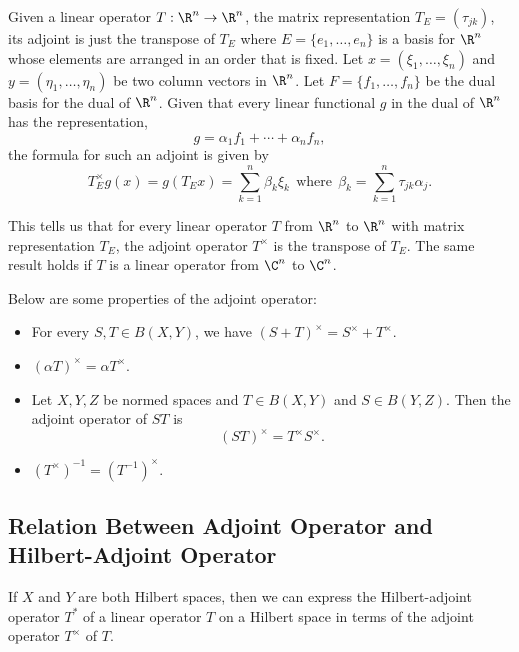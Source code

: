 \begin{eg}
  Given a linear operator \( T: \R^{n} \to \R^{n} \), the matrix representation \( {T}_{E} = ({\tau}_{jk})  \), its adjoint is just the transpose of \( {T}_{E} \) where \( E = \{  {e}_{1}, \dots, {e}_{n} \}   \) is a basis for \( \R^{n} \) whose elements are arranged in an order that is fixed. Let \( x = ({\xi}_{1}, \dots, {\xi}_{n}) \) and \( y = ({\eta}_{1} ,\dots, {\eta}_{n}) \) be two column vectors in \( \R^{n} \). Let \( F = \{  {f}_{1}, \dots, {f}_{n} \}   \) be the dual basis for the dual of \( \R^{n} \). Given that every linear functional \( g   \) in the dual of \( \R^{n} \) has the representation, 
  \[  g = {\alpha}_{1} {f}_{1} + \cdots + {\alpha}_{n} {f}_{n},  \]
 the formula for such an adjoint is given by   
  \[  {T}_{E}^{\times} g (x) = g ({T}_{E}x) = \sum_{ k=1  }^{ n  } {\beta}_{k} {\xi}_{k} \ \ \text{where} \ \ {\beta}_{k} = \sum_{ k=1  }^{ n } {\tau}_{jk} {\alpha}_{j}. \]

  This tells us that for every linear operator \( T  \) from \( \R^{n} \) to \( \R^{n} \) with matrix representation \( {T}_{E} \), the adjoint operator \( T^{\times} \) is the transpose of \( {T}_{E} \). The same result holds if \( T  \) is a linear operator from \( \C^{n} \) to \( \C^{n} \). 
\end{eg}

Below are some properties of the adjoint operator:

\begin{itemize}
    \item For every \( S,T \in B(X,Y) \), we have \( (S+T)^{\times} = S^{\times} + T^{\times} \).
    \item \( (\alpha T)^{\times} = \alpha T^{\times} \). 
    \item Let \( X,Y,Z  \) be normed spaces and \( T \in B(X,Y) \) and \( S \in B(Y,Z) \). Then the adjoint operator of \( ST \) is
        \[  (ST)^{\times} = T^{\times} S^{\times}. \]
    \item \( (T^{\times})^{-1} = (T^{-1})^{\times} \).
\end{itemize}

\subsection{Relation Between Adjoint Operator and Hilbert-Adjoint Operator}

If \( X  \) and \( Y  \) are both Hilbert spaces, then we can express the Hilbert-adjoint operator \( T^{*} \) of a linear operator \( T  \) on a Hilbert space in terms of the adjoint operator \( T^{\times} \) of \( T  \).

